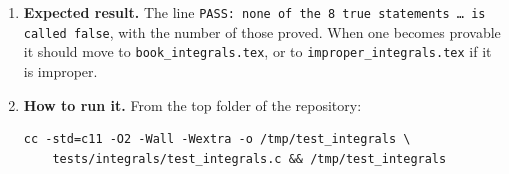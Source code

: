 \documentclass[11pt,a4paper]{article}
\begin{document}
\begin{enumerate}
\item \textbf{Expected result.} The line \texttt{PASS: none of the 8 true statements \ldots{} is called false}, with the number of those proved. When one becomes provable it should move to \texttt{book\_integrals.tex}, or to \texttt{improper\_integrals.tex} if it is improper.

\item \textbf{How to run it.} From the top folder of the repository:
\begin{verbatim}
cc -std=c11 -O2 -Wall -Wextra -o /tmp/test_integrals \
    tests/integrals/test_integrals.c && /tmp/test_integrals
\end{verbatim}
\end{enumerate}
\end{document}
